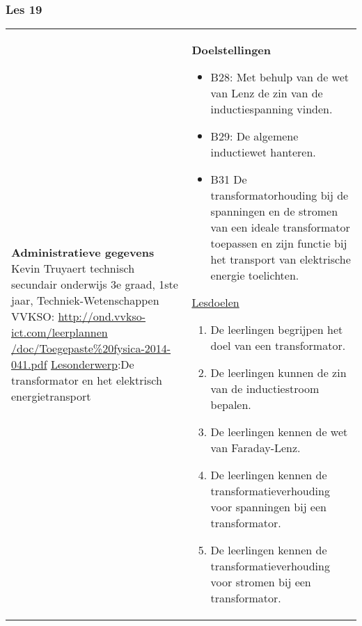 


\begin{landscape}
	\subsubsection{Les 19}
	\begin{tabularx}{1.56\textwidth}{|p{}|X|}\hline
		\textbf{Administratieve gegevens}\newline\newline
		Kevin Truyaert\newline\newline
		technisch secundair onderwijs\newline
		3e graad, 1ste jaar, Techniek-Wetenschappen\newline
		VVKSO: \href{http://ond.vvkso-ict.com/leerplannen/doc/Toegepaste\%20fysica-2014-041.pdf}{http://ond.vvkso-ict.com/leerplannen /doc/Toegepaste\%20fysica-2014-041.pdf} \newline
		\underline{Lesonderwerp}:\newline De transformator en het elektrisch energietransport  & \textbf{Doelstellingen}
		\begin{itemize}[itemsep=0.08\baselineskip]
			\item B28: Met behulp van de wet van Lenz de zin van de inductiespanning vinden.
			\item B29: De algemene inductiewet hanteren.
			\item B31 De transformatorhouding bij de spanningen en de stromen van een ideale transformator toepassen en zijn functie bij het transport van elektrische energie toelichten.
		\end{itemize}
		\underline{Lesdoelen}\newline
		\vspace{-0.75cm}
		\begin{enumerate}[itemsep=0.08\baselineskip]
			\item De leerlingen begrijpen het doel van een transformator.
			\item De leerlingen kunnen de zin van de inductiestroom bepalen.
			\item De leerlingen kennen de wet van Faraday-Lenz.
			\item De leerlingen kennen de transformatieverhouding voor spanningen bij een transformator.
			\item De leerlingen kennen de transformatieverhouding voor stromen bij een transformator.

\end{enumerate}
\end{tabularx}
\end{landscape}
